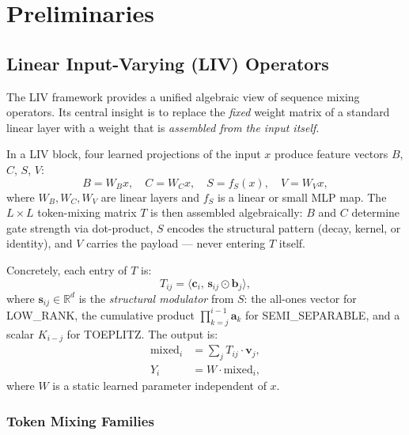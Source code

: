 \section{Preliminaries}
\label{sec:prelim}

\subsection{Linear Input-Varying (LIV) Operators}

The LIV framework \cite{thomas2024star,massaroli2024liv} provides a unified algebraic view of sequence mixing operators.
Its central insight is to replace the \emph{fixed} weight matrix of a standard linear layer with a weight that is \emph{assembled from the input itself}.

In a LIV block, four learned projections of the input $x$ produce feature vectors $B$, $C$, $S$, $V$:
\begin{equation}
  B = W_B x, \quad C = W_C x, \quad S = f_S(x), \quad V = W_V x,
  \label{eq:featurizer}
\end{equation}
where $W_B, W_C, W_V$ are linear layers and $f_S$ is a linear or small MLP map.
The $L \times L$ token-mixing matrix $T$ is then assembled algebraically: $B$ and $C$ determine gate strength via dot-product, $S$ encodes the structural pattern (decay, kernel, or identity), and $V$ carries the payload — never entering $T$ itself.

Concretely, each entry of $T$ is:
\begin{equation}
  T_{ij} = \langle\mathbf{c}_i,\, \mathbf{s}_{ij} \odot \mathbf{b}_j\rangle,
  \label{eq:tij}
\end{equation}
where $\mathbf{s}_{ij} \in \mathbb{R}^d$ is the \emph{structural modulator} from $S$: the all-ones vector for LOW\_RANK, the cumulative product $\prod_{k=j}^{i-1}\mathbf{a}_k$ for SEMI\_SEPARABLE, and a scalar $K_{i-j}$ for TOEPLITZ.
The output is:
\begin{align}
  \mathrm{mixed}_i &= \sum_j T_{ij} \cdot \mathbf{v}_j,
  \label{eq:token_mix} \\
  Y_i &= W \cdot \mathrm{mixed}_i,
  \label{eq:channel_mix}
\end{align}
where $W$ is a static learned parameter independent of $x$.

\subsubsection{Token Mixing Families}

